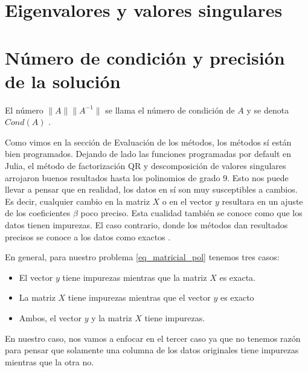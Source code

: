 \section{Eigenvalores y valores singulares}

\section{Número de condición y precisión de la solución}

\begin{definition}
El número $\parallel A \parallel  \parallel A^{-1} \parallel$ se llama el número de condición de $A$ y se denota $Cond(A)$ \cite[p.~62]{numerical_linear_algebra}. 
\end{definition}

Como vimos en la sección de Evaluación de los métodos, los métodos sí están bien programados. Dejando de lado las funciones programadas por default en Julia, el método de factorización QR y descomposición de valores singulares arrojaron buenos resultados hasta los polinomios de grado 9. Esto nos puede llevar a pensar que en realidad, los datos en sí son muy susceptibles a cambios. Es decir, cualquier cambio en la matriz $X$ o en el vector $y$ resultara en un ajuste de los coeficientes $\beta$ poco preciso. Esta cualidad también se conoce como que los datos tienen impurezas. El caso contrario, donde los métodos dan resultados precisos se conoce a los datos como exactos \cite{numerical_linear_algebra}.


En general, para nuestro problema \ref{eq_matricial_pol} tenemos tres casos: 
\begin{itemize}
    \item El vector $y$ tiene impurezas mientras que la matriz $X$ es exacta. 
    \item La matriz $X$ tiene impurezas mientras que el vector $y$ es exacto
    \item Ambos, el vector $y$ y la matriz $X$ tiene impurezas. 
\end{itemize}

En nuestro caso, nos vamos a enfocar en el tercer caso ya que no tenemos razón para pensar que solamente una columna de los datos originales tiene impurezas mientras que la otra no. 


